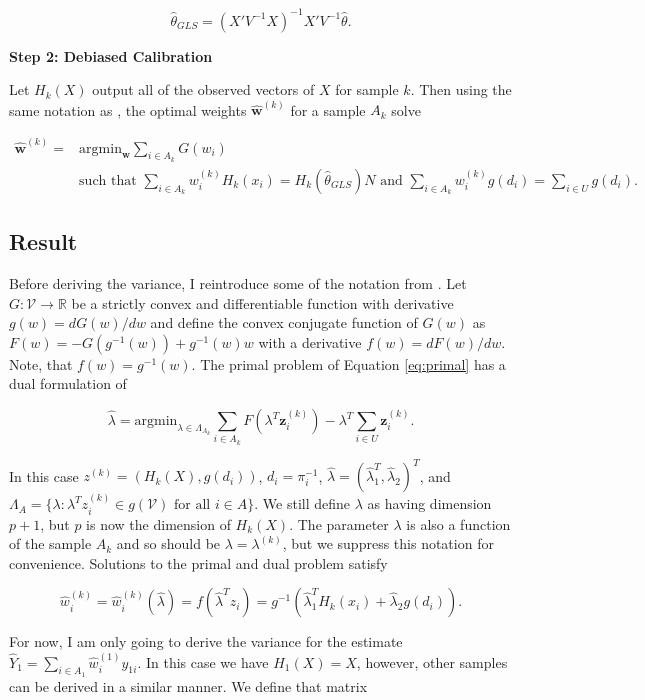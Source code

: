 \documentclass[12pt]{article}
\newcommand{\argmin}{{\text{argmin}}}
\newcommand{\R}{\mathbb{R}}
\renewcommand{\bf}[1]{\mathbf{#1}}
\begin{document}
\[\hat \theta_{GLS} = (X'V^{-1}X)^{-1}X'V^{-1}\hat \theta.\]

\textbf{Step 2: Debiased Calibration}

Let $H_k(X)$ output all of the observed vectors of $X$ for sample $k$. Then
using the same notation as \cite{kwon2024debiased}, the optimal weights 
$\hat{\bf{w}}^{(k)}$ for a sample $A_k$ solve

\begin{align}\label{eq:primal}
  \hat{\bf{w}}^{(k)} 
  =& \argmin_{\bf w} \sum_{i \in A_k}G(w_i) \\ 
  &\text{such that } 
  \sum_{i \in A_k} w_i^{(k)} H_k(x_i) = H_k(\hat \theta_{GLS})N \text{ and }
  \sum_{i \in A_k} w_i^{(k)} g(d_i) = \sum_{i \in U} g(d_i). \nonumber
\end{align}

\subsection*{Result}

Before deriving the variance, I reintroduce some of the notation from
\cite{kwon2024debiased}. Let $G: \mathcal{V} \to \R$ be a strictly convex and
differentiable function with derivative $g(w) = dG(w) / dw$ and define the
convex conjugate function of $G(w)$ as $F(w) = -G(g^{-1}(w)) + g^{-1}(w)w$ with
a derivative $f(w) = dF(w) / dw$. Note, that $f(w) = g^{-1}(w)$. The primal
problem of Equation \ref{eq:primal} has a dual formulation of 

\[\hat \lambda = \argmin_{\lambda \in \Lambda_{A_k}} \sum_{i \in A_k} F(\lambda^T
  \bf z_i^{(k)}) - \lambda^T \sum_{i \in U}\bf z_i^{(k)}.\]

In this case $z^{(k)} = (H_k(X), g(d_i))$, $d_i = \pi_i^{-1}$, 
$\hat \lambda = (\hat \lambda_1^T, \hat \lambda_2)^T$, and 
$\Lambda_A = \{\lambda : \lambda^T z_i^{(k)} \in g(\mathcal{V}) 
\text{ for all } i \in A\}$. We still define $\lambda$  as having dimension 
$p + 1$, but $p$ is now the dimension of $H_k(X)$. The parameter $\lambda$ is
also a function of the sample $A_k$ and so should be $\lambda = \lambda^{(k)}$,
but we suppress this notation for convenience. Solutions to the primal and
dual problem satisfy

\[\hat w_i^{(k)} = \hat w_i^{(k)}(\hat \lambda) = f(\hat \lambda^T z_i) = 
  g^{-1}(\hat \lambda_1^T H_k(x_i) + \hat \lambda_2 g(d_i)).\]

For now, I am only going to derive the variance for the estimate $\hat Y_1 =
\sum_{i \in A_1} \hat w_i^{(1)} y_{1i}$. In this case we have $H_1(X) = X$,
however, other samples can be derived in a similar manner. 
We define that matrix
\end{document}
